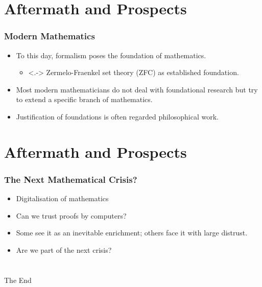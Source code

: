 \documentclass{beamer}
\begin{document}
\section{Aftermath and Prospects}
\begin{frame}
    \frametitle{Modern Mathematics}
    \begin{itemize}[<+->]
	\item To this day, formalism poses the foundation of mathematics.
	\begin{itemize}
		\item<.-> Zermelo-Fraenkel set theory (ZFC) as established foundation.
	\end{itemize}
	\item Most modern mathematicians do not deal with foundational research but try to extend a specific branch of mathematics.
	\item Justification of foundations is often regarded philosophical work.
    \end{itemize}
\end{frame}
\section{Aftermath and Prospects}
\begin{frame}
    \frametitle{The Next Mathematical Crisis?}
    \begin{itemize}[<+->]
	\item Digitalisation of mathematics
	\item Can we trust proofs by computers?
	\item Some see it as an inevitable enrichment; others face it with large distrust.
	\item Are we part of the next crisis?
    \end{itemize}
\end{frame}
\section*{}
\begin{frame}
    \Huge{\centerline{The End}}
\end{frame}

\newpage


\end{document}
